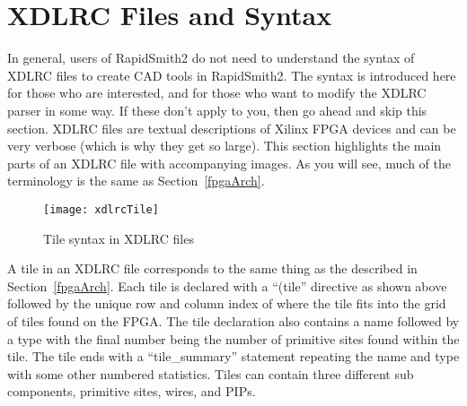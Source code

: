 \newpage
\section{XDLRC Files and Syntax} \label{sec:appendixXDLRC}
\graphicspath{{./techReportFigures/appendixA/}}
In general, users of RapidSmith2 do not need to understand the syntax of XDLRC
files to create CAD tools in RapidSmith2. The syntax is introduced here for those
who are interested, and for those who want to modify the XDLRC parser
in some way. If these don't apply to you, then go ahead and skip this section.
XDLRC files are textual descriptions of Xilinx FPGA devices and can be very
verbose (which is why they get so large). This section highlights the main parts
of an XDLRC file with accompanying images. As you will see, much of the
terminology is the same as Section~\ref{fpgaArch}.

\bigbreak \noindent
\begin{large}
\end{large}

\begin{figure}[H]
	\centering
	\texttt{[image: xdlrcTile]}
	\caption{Tile syntax in XDLRC files}
	\label{fig:xdlrcTile}
\end{figure}

\noindent
A tile in an XDLRC file corresponds to the same thing as the 
described in Section~\ref{fpgaArch}. Each tile is declared with a ``(tile''
directive as shown above followed by the unique row and column index of where
the tile fits into the grid of tiles found on the FPGA. The tile declaration
also contains a name followed by a type with the final number being the number
of primitive sites found within the tile. The tile ends with a ``tile\_summary''
statement repeating the name and type with some other numbered statistics.
Tiles can contain three different sub components, primitive sites, wires, and
PIPs.

\bigbreak \noindent
\begin{large}
\end{large}

